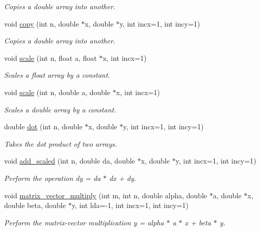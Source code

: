 \begin{DoxyCompactItemize}
\begin{DoxyCompactList}\small\item\em Copies a double array into another. \end{DoxyCompactList}\item 
void \hyperlink{namespaceutils_ad0a7847c08fc8930fa817b3993c2357f}{copy} (int n, double $\ast$x, double $\ast$y, int incx=1, int incy=1)
\begin{DoxyCompactList}\small\item\em Copies a double array into another. \end{DoxyCompactList}\item 
void \hyperlink{namespaceutils_a2f7633cf62c8fbf04542c16cd25ac954}{scale} (int n, float a, float $\ast$x, int incx=1)
\begin{DoxyCompactList}\small\item\em Scales a float array by a constant. \end{DoxyCompactList}\item 
void \hyperlink{namespaceutils_a9fd21a47ebc85aef5ef6bab18d3081ff}{scale} (int n, double a, double $\ast$x, int incx=1)
\begin{DoxyCompactList}\small\item\em Scales a double array by a constant. \end{DoxyCompactList}\item 
double \hyperlink{namespaceutils_a9e636142e9a630aee25812c5b558205c}{dot} (int n, double $\ast$x, double $\ast$y, int incx=1, int incy=1)
\begin{DoxyCompactList}\small\item\em Takes the dot product of two arrays. \end{DoxyCompactList}\item 
void \hyperlink{namespaceutils_a335999fcf29f6dfae2a4e630b5ca53d9}{add\-\_\-scaled} (int n, double da, double $\ast$x, double $\ast$y, int incx=1, int incy=1)
\begin{DoxyCompactList}\small\item\em Perform the operation dy = da $\ast$ dx + dy. \end{DoxyCompactList}\item 
void \hyperlink{namespaceutils_a86f1146cab3c538fef7502930e2813b9}{matrix\-\_\-vector\-\_\-multiply} (int m, int n, double alpha, double $\ast$a, double $\ast$x, double beta, double $\ast$y, int lda=-\/1, int incx=1, int incy=1)
\begin{DoxyCompactList}\small\item\em Perform the matrix-\/vector multiplication y = alpha $\ast$ a $\ast$ x + beta $\ast$ y. \end{DoxyCompactList}\end{DoxyCompactItemize}


